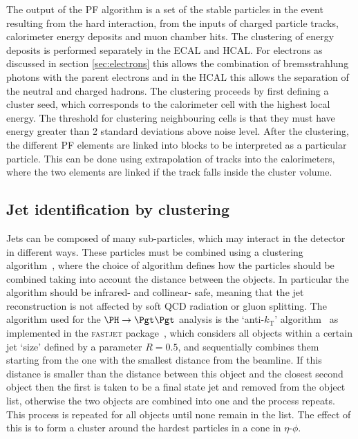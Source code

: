 The output of the \ac{PF} algorithm is a set of the stable particles in the event
resulting from the hard interaction, from the inputs of charged particle tracks,
calorimeter energy deposits and muon chamber hits. The clustering of energy
deposits is performed separately in the \ac{ECAL} and \ac{HCAL}. For electrons
as discussed in section \ref{sec:electrons} this allows the combination of
bremsstrahlung photons with the parent electrons and in the \ac{HCAL} this
allows the separation of the neutral and charged hadrons. The clustering
proceeds by first defining a cluster seed, which corresponds to the calorimeter
cell with the highest local energy. The threshold for clustering neighbouring
cells is that they must have energy greater than 2 standard deviations above
noise level. After the clustering, the different \ac{PF} elements are linked into
blocks to be interpreted as a particular particle. This can be done using
extrapolation of tracks into the calorimeters, where the two elements are linked
if the track falls inside the cluster volume.

\subsection{Jet identification by clustering}
\label{sec:jetID}

Jets can be composed of many sub-particles, which may interact in the detector
in different ways. These particles must be combined using a clustering
algorithm~\cite{Salam:2009jx}, where the choice of algorithm defines how the particles should be combined
taking into account the distance between the objects. In particular the
algorithm should be infrared- and collinear- safe, meaning that the jet
reconstruction is not affected by soft QCD radiation or gluon splitting.
The algorithm used for the $\PH\to\Pgt\Pgt$ analysis is the
`anti-$k_{\text{T}}$' algorithm~\cite{Cacciari:2008gp} as implemented in
the \textsc{fastjet} package~\cite{Cacciari:fastjet1}, which considers all 
objects within a certain jet `size' defined by a parameter $R=0.5$, and 
sequentially combines them starting from the one with the
smallest distance from the beamline. If this distance is smaller than the
distance between this object and the closest second object then the first is
taken to be a final state jet and removed from the object list,
otherwise the two objects are combined into one and the process repeats. 
This process is repeated for all objects until none remain in the list. The effect of this
is to form a cluster around the hardest particles in a cone in $\eta$-$\phi$.


